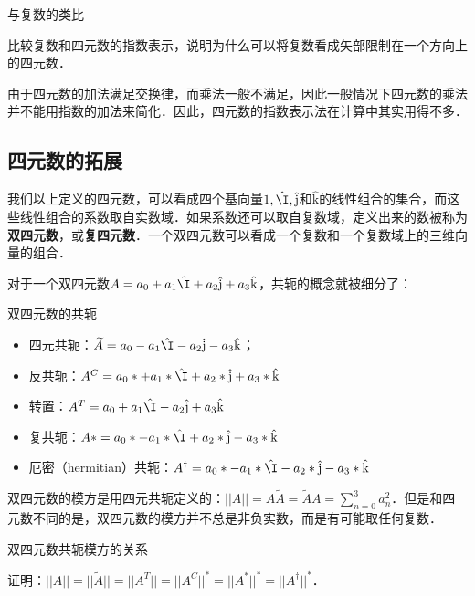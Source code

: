 \begin{exercise}{与复数的类比}

比较复数和四元数的指数表示，说明为什么可以将复数看成矢部限制在一个方向上的四元数．

\end{exercise}

由于四元数的加法满足交换律，而乘法一般不满足，因此一般情况下四元数的乘法并不能用指数的加法来简化．因此，四元数的指数表示法在计算中其实用得不多．

\subsection{四元数的拓展}

我们以上定义的四元数，可以看成四个基向量$1, \hat{\I}, \hat{\mathrm{j}}$和$\hat{\mathrm{k}}$的线性组合的集合，而这些线性组合的系数取自实数域．如果系数还可以取自复数域，定义出来的数被称为\textbf{双四元数}，或\textbf{复四元数}．一个双四元数可以看成一个复数和一个复数域上的三维向量的组合．

对于一个双四元数$A=a_0+a_1\hat{\I}+a_2\hat{\mathrm{j}}+a_3\hat{\mathrm{k}}$，共轭的概念就被细分了：

\begin{definition}{双四元数的共轭}
\begin{itemize}

\item 四元共轭：$\widetilde{A}=a_0-a_1\hat{\I}-a_2\hat{\mathrm{j}}-a_3\hat{\mathrm{k}}$；
\item 反共轭：$A^C=a_0*+a_1*\hat{\I}+a_2*\hat{\mathrm{j}}+a_3*\hat{\mathrm{k}}$
\item 转置：$A^T=a_0+a_1\hat{\I}-a_2\hat{\mathrm{j}}+a_3\hat{\mathrm{k}}$
\item 复共轭：$A*=a_0*-a_1*\hat{\I}+a_2*\hat{\mathrm{j}}-a_3*\hat{\mathrm{k}}$
\item 厄密（hermitian）共轭：$A^\dagger=a_0*-a_1*\hat{\I}-a_2*\hat{\mathrm{j}}-a_3*\hat{\mathrm{k}}$

\end{itemize}
\end{definition}

双四元数的模方是用四元共轭定义的：$||A||=A\widetilde{A}=\widetilde{A}A=\sum^{3}_{n=0}a^2_n$．但是和四元数不同的是，双四元数的模方并不总是非负实数，而是有可能取任何复数．

\begin{exercise}{双四元数共轭模方的关系}

证明：$||A||=||\widetilde{A}||=||A^T||=||A^C||^*=||A^*||^*=||A^\dagger||^*$．

\end{exercise}

